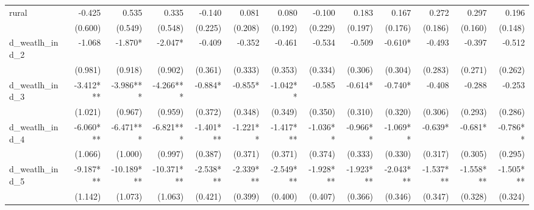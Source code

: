 \begin{tabular}{lrrrrrrrrrrrr}
rural                                       &       -0.425 &        0.535 &        0.335 &       -0.140 &        0.081 &        0.080 &       -0.100 &        0.183 &        0.167 &        0.272 &        0.297 &        0.196 \\ 
                                            &      (0.600) &      (0.549) &      (0.548) &      (0.225) &      (0.208) &      (0.192) &      (0.229) &      (0.197) &      (0.176) &      (0.186) &      (0.160) &      (0.148) \\ 
d\_weatlh\_ind\_2                           &       -1.068 &      -1.870* &      -2.047* &       -0.409 &       -0.352 &       -0.461 &       -0.534 &       -0.509 &      -0.610* &       -0.493 &       -0.397 &       -0.512 \\ 
                                            &      (0.981) &      (0.918) &      (0.902) &      (0.361) &      (0.333) &      (0.353) &      (0.334) &      (0.306) &      (0.304) &      (0.283) &      (0.271) &      (0.262) \\ 
d\_weatlh\_ind\_3                           &    -3.412*** &    -3.986*** &    -4.266*** &      -0.884* &      -0.855* &     -1.042** &       -0.585 &      -0.614* &      -0.740* &       -0.408 &       -0.288 &       -0.253 \\ 
                                            &      (1.021) &      (0.967) &      (0.959) &      (0.372) &      (0.348) &      (0.349) &      (0.350) &      (0.310) &      (0.320) &      (0.306) &      (0.293) &      (0.286) \\ 
d\_weatlh\_ind\_4                           &    -6.060*** &    -6.471*** &    -6.821*** &    -1.401*** &     -1.221** &    -1.417*** &     -1.036** &     -0.966** &     -1.069** &      -0.639* &      -0.681* &     -0.786** \\ 
                                            &      (1.066) &      (1.000) &      (0.997) &      (0.387) &      (0.371) &      (0.371) &      (0.374) &      (0.333) &      (0.330) &      (0.317) &      (0.305) &      (0.295) \\ 
d\_weatlh\_ind\_5                           &    -9.187*** &   -10.189*** &   -10.371*** &    -2.538*** &    -2.339*** &    -2.549*** &    -1.928*** &    -1.923*** &    -2.043*** &    -1.537*** &    -1.558*** &    -1.505*** \\ 
                                            &      (1.142) &      (1.073) &      (1.063) &      (0.421) &      (0.399) &      (0.400) &      (0.407) &      (0.366) &      (0.346) &      (0.347) &      (0.328) &      (0.324) \\ 

\end{tabular}
